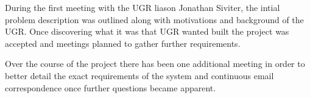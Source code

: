 During the first meeting with the UGR liason Jonathan Siviter, the intial problem description was outlined along with motivations and background of the UGR. Once discovering what it was that UGR wanted built the project was accepted and meetings planned to gather further requirements. 

Over the course of the project there has been one additional meeting in order to better detail the exact requirements of the system and continuous email correspondence once further questions became apparent.
